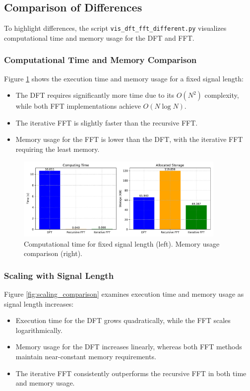 \documentclass[12pt, a4paper]{report}
\begin{document}
\subsection{Comparison of Differences}
To highlight differences, the script \texttt{vis\_dft\_fft\_different.py} visualizes computational time and memory usage for the \ac{DFT} and \ac{FFT}.

\subsubsection{Computational Time and Memory Comparison}
Figure \ref{fig:time_memory_comparison} shows the execution time and memory usage for a fixed signal length:
\begin{itemize}
	\item The \ac{DFT} requires significantly more time due to its \(O(N^2)\) complexity, while both \ac{FFT} implementations achieve \(O(N \log N)\).
	\item The iterative \ac{FFT} is slightly faster than the recursive \ac{FFT}.
	\item Memory usage for the \ac{FFT} is lower than the \ac{DFT}, with the iterative \ac{FFT} requiring the least memory.
\end{itemize}

\begin{figure}[h!]
	\centering
	\includegraphics[width=0.9\textwidth]{figures/dft_fftr_ffti.pdf}
	\caption{Computational time for fixed signal length (left). Memory usage comparison (right).}
	\label{fig:time_memory_comparison}
\end{figure}

\subsubsection{Scaling with Signal Length}
Figure \ref{fig:scaling_comparison} examines execution time and memory usage as signal length increases:
\begin{itemize}
	\item Execution time for the \ac{DFT} grows quadratically, while the \ac{FFT} scales logarithmically.
	\item Memory usage for the \ac{DFT} increases linearly, whereas both \ac{FFT} methods maintain near-constant memory requirements.
	\item The iterative \ac{FFT} consistently outperforms the recursive \ac{FFT} in both time and memory usage.
\end{itemize}
\end{document}

